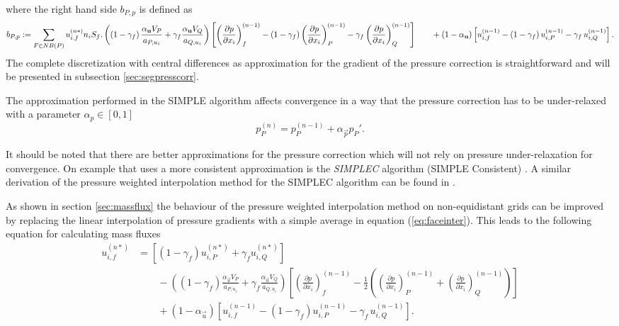   where the right hand side \(b_{P,p}\) is defined as
  \begin{equation}
    \label{eq:presscorrb}
    b_{P,p} := \sum_{F \in NB(P)} u_{i,f}^{(n*)} n_i S_f.
    \left(\left(1 - \gamma_f\right) \frac{\alpha_\vec{u} V_P}{a_{P,u_i}} + \gamma_f \frac{\alpha_\vec{u} V_Q}{a_{Q,u_i}}\right)
    \left[ 
    \left(\frac{\partial p}{\partial x_i}\right)_f^{(n-1)} 
    - \left( 1 - \gamma_f \right) \left( \frac{\partial p}{\partial x_i} \right)_P^{(n-1)} 
    - \gamma_f \left(\frac{\partial p}{\partial x_i}\right)_Q^{(n-1)}
    \right] \nonumber \\[1em]
    \quad\quad + \left(1 - \alpha_\vec{u}\right) \left[ u_{i,f}^{(n-1)} - \left(1 - \gamma_f\right) u_{i,P}^{(n-1)} - \gamma_f \, u_{i,Q}^{(n-1)} \right].
  \end{equation}
  The complete discretization with central differences as approximation for the gradient of the pressure correction is straightforward and will be presented in subsection \ref{sec:segpresscorr}.
  
  The approximation performed in the SIMPLE algorithm affects convergence in a way that the pressure correction has to be under-relaxed with a parameter \(\alpha_p \in [0,1]\)
  \begin{equation}
    \label{eq:pressupdate}
    p_P^{(n)} = p_P^{(n-1)} + \alpha_{\vec{p}} p_P'.
  \end{equation}

  It should be noted that there are better approximations for the pressure correction which will not rely on pressure under-relaxation for convergence. On example that uses a more consistent approximation is the \emph{SIMPLEC} algorithm (SIMPLE Consistent) \cite{doormaal84}. A similar derivation of the pressure weighted interpolation method for the SIMPLEC algorithm can be found in \cite{miller88}.

  As shown in section \ref{sec:massflux} the behaviour of the pressure weighted interpolation method on non-equidistant grids can be improved by replacing the linear interpolation of pressure gradients with a simple average in equation (\ref{eq:faceinter}). This leads to the following equation for calculating mass fluxes
  \begin{align}
    \label{eq:facecorr2}
    u_{i,f}^{(n*)} 
    &=
    \left[\left(1 - \gamma_f\right) u_{i,P}^{(n*)} + \gamma_f u_{i,Q}^{(n*)} \right] \nonumber\\[1em]
    &\quad\quad - 
    \left(\left(1 - \gamma_f\right) \frac{\alpha_\vec{u} V_P}{a_{P,u_i}} + \gamma_f \frac{\alpha_\vec{u} V_Q}{a_{Q,u_i}}\right)
    \left[ 
    \left(\frac{\partial p}{\partial x_i}\right)_f^{(n-1)} 
    -  \frac{1}{2} \left( \left( \frac{\partial p}{\partial x_i} \right)_P^{(n-1)} 
    +  \left(\frac{\partial p}{\partial x_i}\right)_Q^{(n-1)} \right)
    \right] \nonumber \\[1em]
    &\quad\quad + \left(1 - \alpha_\vec{u}\right) \left[ u_{i,f}^{(n-1)} - \left(1 - \gamma_f\right) u_{i,P}^{(n-1)} - \gamma_f \, u_{i,Q}^{(n-1)} \right].
  \end{align}

